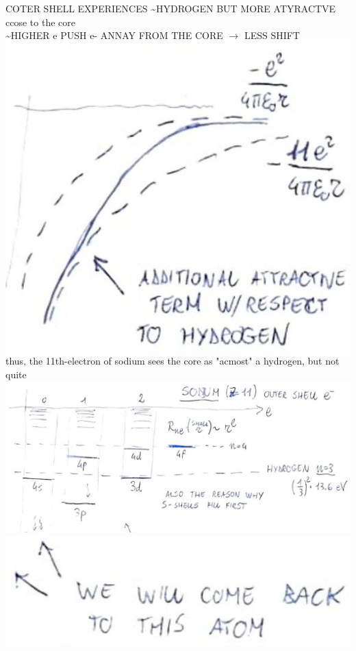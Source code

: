 \documentclass[10pt]{article}
\begin{document}
COTER SHELL EXPERIENCES \~{}HYDROGEN BUT MORE ATYRACTVE ccose to the core\\
\~{}HIGHER e PUSH e- ANNAY FROM THE CORE $\rightarrow$ LESS SHIFT\\
\includegraphics[max width=\textwidth, center]{2025_10_16_22329e0f50bdd2511b17g-12(3)}\\
thus, the 11th-electron of sodium sees the core as "acmost" a hydrogen, but not quite\\
\includegraphics[max width=\textwidth, center]{2025_10_16_22329e0f50bdd2511b17g-12(4)}\\
\includegraphics[max width=\textwidth, center]{2025_10_16_22329e0f50bdd2511b17g-12}
\end{document}
